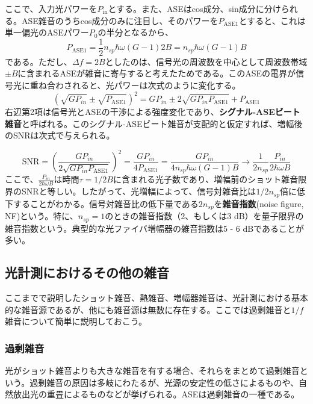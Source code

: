 ここで、入力光パワーを$P_\mathrm{in}$とする。また、ASEはcos成分、sin成分に分けられる。ASE雑音のうちcos成分のみに注目し、そのパワーを$P_\mathrm{ASE1}$とすると、これは単一偏光のASEパワー$P_0$の半分となるから、
\begin{equation}
  P_\mathrm{ASE1} = \frac{1}{2}n_{sp}\hbar\omega(G-1)2B = n_{sp}\hbar\omega(G-1)B 
\end{equation}
である。ただし、$\Delta f = 2B$としたのは、信号光の周波数を中心として周波数帯域$\pm B$に含まれるASEが雑音に寄与すると考えたためである。このASEの電界が信号光に重ね合わされると、光パワーは次式のように変化する。
\begin{equation}
  \left(\sqrt{GP_{in}} \pm \sqrt{P_\mathrm{ASE1}}\right)^2 = GP_{in} \pm 2\sqrt{GP_{in}P_\mathrm{ASE1}} + P_\mathrm{ASE1}
\end{equation}
右辺第2項は信号光とASEの干渉による強度変化であり、\textbf{シグナル-ASEビート雑音}と呼ばれる。このシグナル-ASEビート雑音が支配的と仮定すれば、増幅後のSNRは次式で与えられる。

\begin{equation}
  \mathrm{SNR} = \left(\frac{GP_{in}}{2\sqrt{GP_{in}P_\mathrm{ASE1}}}\right)^2 = \frac{GP_{in}}{4P_\mathrm{ASE1}}=\frac{GP_{in}}{4n_{sp}\hbar\omega(G-1)B}\to \frac{1}{2n_{sp}}\frac{P_{in}}{2\hbar\omega B}
\end{equation}
ここで、$\frac{P_{in}}{2\hbar\omega B}$は時間$\tau = 1/2B$に含まれる光子数であり、増幅前のショット雑音限界のSNRと等しい。したがって、光増幅によって、信号対雑音比は$1/2n_{sp}$倍に低下することがわかる。信号対雑音比の低下量である$2n_{sp}$を\textbf{雑音指数}(noise figure, NF)という。特に、$n_{sp} = 1$のときの雑音指数（2、もしくは3 dB）を量子限界の雑音指数という。典型的な光ファイバ増幅器の雑音指数は5 - 6 dBであることが多い。

\subsection{光計測におけるその他の雑音}
ここまでで説明したショット雑音、熱雑音、増幅器雑音は、光計測における基本的な雑音源であるが、他にも雑音源は無数に存在する。ここでは過剰雑音と$1/f$雑音について簡単に説明しておこう。

\subsubsection{過剰雑音}
光がショット雑音よりも大きな雑音を有する場合、それらをまとめて過剰雑音という。過剰雑音の原因は多岐にわたるが、光源の安定性の低さによるものや、自然放出光の重畳によるものなどが挙げられる。ASEは過剰雑音の一種である。

